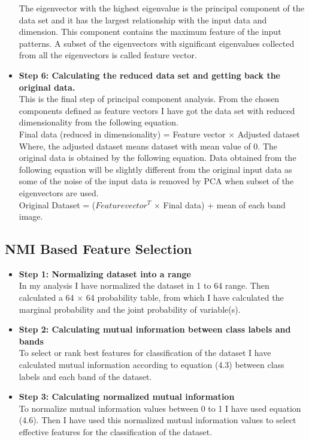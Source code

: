 \documentclass[document.tex]{subfiles}
\begin{document}
\begin{itemize}
	The eigenvector with the highest eigenvalue is the principal component of the
	data set and it has the largest relationship with the input data and dimension.
	This component contains the maximum feature of the input patterns. A subset of
	the eigenvectors with significant eigenvalues collected from all the eigenvectors is
	called feature vector.
	\item \textbf{ Step 6: Calculating the reduced data set and getting back the original
	data.}\\
	This is the final step of principal component analysis. From the chosen components
	defined as feature vectors I have got the data set with reduced dimensionality from
	the following equation.\\
	Final data (reduced in dimensionality) = Feature vector $\times$ Adjusted dataset\\
	Where, the adjusted dataset means dataset with mean value of 0. The original data
	is obtained by the following equation. Data obtained from the following equation
	will be slightly different from the original input data as some of the noise of the
	input data is removed by PCA when subset of the eigenvectors are used.\\ Original Dataset = ($Featurevector^T$ $\times$ Final data) + mean of each band image.
\end{itemize}

\subsection{NMI Based Feature Selection}
\begin{itemize}
	\item \textbf{Step 1: Normalizing dataset into a range}\\
	In my analysis I have normalized the dataset in 1 to 64 range. Then calculated a 64 $\times$ 64 probability table, from which I have calculated the marginal probability and the joint probability of variable(s). 
	\item \textbf{Step 2: Calculating mutual information between class labels and bands}\\
	To select or rank best features for classification of the dataset I have calculated mutual information according to equation (4.3) between class labels and each band of the dataset.
	\item \textbf{Step 3: Calculating normalized mutual information}\\
	To normalize mutual information values between 0 to 1 I have used equation (4.6). Then I have used this normalized mutual information values to select effective features for the classification of the dataset. 
\end{itemize}
\end{document}
